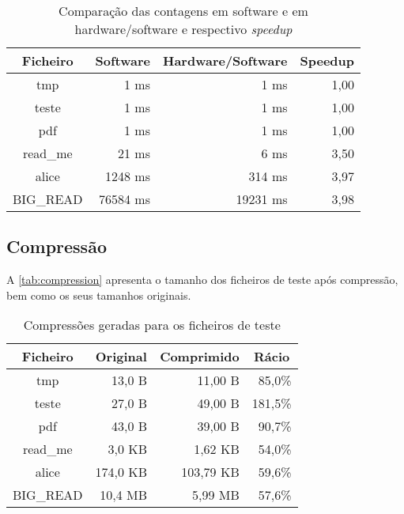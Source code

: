  \begin{table}[h]
    \centering
    \caption{Comparação das contagens em software e em \\hardware/software e respectivo \textit{speedup}}

    \begin{tabular}{|c|r|r|r|}
      \hline
      \textbf{Ficheiro}                                 &
      \multicolumn{1}{c|}{\textbf{Software}}            &
      \multicolumn{1}{c|}{\textbf{Hardware/Software}}   &
      \multicolumn{1}{c|}{\textbf{Speedup}}       \\ \hline \hline
      tmp        & \ 1 ms     & 1 ms     & 1,00   \\ \hline
      teste      & \ 1 ms     & 1 ms     & 1,00   \\ \hline
      pdf        & \ 1 ms     & 1 ms     & 1,00   \\ \hline
      read\_me   & 21 ms      & 6 ms     & 3,50   \\ \hline
      alice      & 1248 ms    & 314 ms   & 3,97   \\ \hline
      BIG\_READ  & 76584 ms   & 19231 ms & 3,98   \\
      \hline
    \end{tabular}
    \label{tab:time_hardware}
  \end{table}


  \subsection{Compressão}

  A \autoref{tab:compression} apresenta o tamanho dos ficheiros de teste após compressão, bem como os seus tamanhos originais.

  \begin{table}[h]
    \centering
    \caption{Compressões geradas para os ficheiros de teste}
    \begin{tabular}{|c|r|r|r|}
        \hline
        \textbf{Ficheiro}                                 &
        \multicolumn{1}{c|}{\textbf{Original}}            &
        \multicolumn{1}{c|}{\textbf{Comprimido}}          &
        \multicolumn{1}{c|}{\textbf{Rácio}}\\ \hline \hline
        tmp        &  13,0  B    &  11,00 B          & 85,0\%     \\ \hline
        teste      &  27,0  B    &  49,00 B          & 181,5\%    \\ \hline
        pdf        &  43,0  B    &  39,00 B          & 90,7\%     \\ \hline
        read\_me   &  3,0  KB    &  1,62 KB          & 54,0\%     \\ \hline
        alice      &  174,0 KB   &  103,79 KB        & 59,6\%     \\ \hline
        BIG\_READ  &  10,4 MB    &  5,99 MB          & 57,6\%     \\
        \hline
    \end{tabular}
    \label{tab:compression}
  \end{table}

